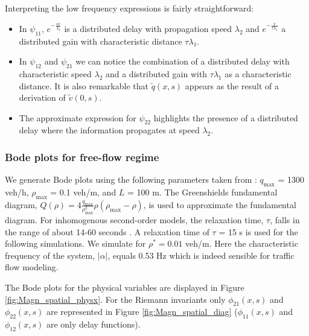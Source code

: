 \documentclass[preprint]{elsarticle}
\begin{document}
Interpreting the low frequency expressions is fairly straightforward:
\begin{itemize}
\item In $\psi_{11}$, $e^{-\frac{sx}{\lambda_{2}}}$ is a distributed delay with propagation speed $\lambda_{2}$ and $e^{-\frac{x}{\tau\lambda_{1}}}$ a distributed gain with characteristic distance $\tau\lambda_{1}$.
\item In $\psi_{12}$ and $\psi_{21}$ we can notice the combination of a distributed delay with  characteristic speed $\lambda_{2}$ and a distributed gain with $\tau\lambda_{1}$ as a characteristic distance. It is also remarkable that $\widetilde{q}(x,s)$ appears as the result of a derivation of $\widetilde{v}(0,s)$.
\item The approximate expression for $\psi_{22}$ highlights the presence of a distributed delay where the information propagates at speed $\lambda_{2}$.
\end{itemize}


\subsubsection{Bode plots for free-flow regime}

We generate Bode plots using the following parameters taken from \cite{Hofleitner}: $q_{\text{max}}$ = 1300 veh/h, $\rho_{\text{max}}$ = 0.1 veh/m, and $L$ = 100 m. The Greenshields fundamental diagram, $Q( \rho) = 4 \frac{q_{\text{max}}}{\rho_{\text{max}}^2}\rho (\rho_{\text{max}} - \rho)$, is used to approximate the fundamental diagram. For inhomogenous second-order models, the relaxation time, $\tau$, falls in the range of about 14-60 seconds \cite{Fan}. A relaxation time of $\tau$ = 15 s is used for the following simulations. We simulate for $\rho^* = 0.01$ veh/m. Here the characteristic frequency of the system, $\left|\alpha\right|$, equals 0.53 Hz which is indeed sensible for traffic flow modeling.

The Bode plots for the physical variables are displayed in Figure \ref{fig:Magn_spatial_physx}.
For the Riemann invariants only $\phi_{21}(x,s)$ and $\phi_{22}(x,s)$ are represented in Figure \ref{fig:Magn_spatial_diag} ($\phi_{11}(x,s)$ and $\phi_{12}(x,s)$ are only delay functions).
\end{document}

